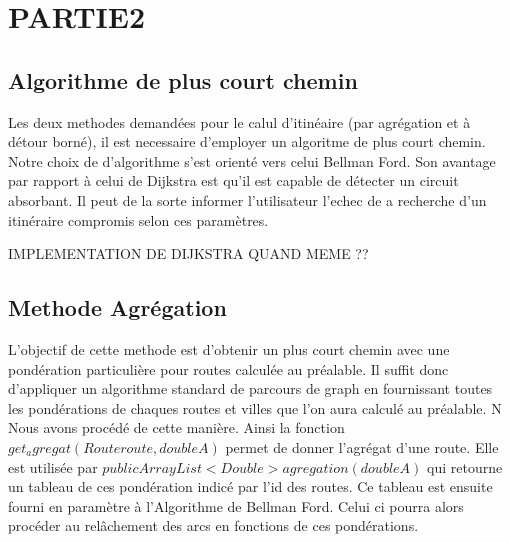 \chapter{PARTIE2}
\section{Algorithme de plus court chemin}
Les deux methodes demandées pour le calul d'itinéaire (par agrégation et à détour borné), il est necessaire  d'employer un algoritme de plus court chemin.
Notre choix de d'algorithme s'est orienté vers celui Bellman Ford. Son avantage par rapport à celui de Dijkstra est qu'il est capable de détecter un circuit absorbant. Il peut de la sorte informer l'utilisateur l'echec de a recherche d'un itinéraire compromis selon ces paramètres. 

IMPLEMENTATION DE DIJKSTRA QUAND MEME ??


\section{Methode Agrégation}
L'objectif de cette methode est d'obtenir un plus court chemin avec une pondération particulière pour routes calculée au préalable.
Il suffit donc d'appliquer un algorithme standard de parcours de graph en fournissant toutes les pondérations de chaques routes et villes que l'on aura calculé au préalable. N Nous avons procédé de cette manière. Ainsi la fonction $get_agregat(Route route, double A)$ permet de donner l'agrégat d'une route. Elle est utilisée par  $public ArrayList<Double> agregation(double A)$ qui retourne un tableau de ces pondération indicé par l'id des routes. Ce tableau est ensuite fourni en paramètre à l'Algorithme de Bellman Ford. Celui ci pourra alors procéder au relâchement des arcs en fonctions de ces pondérations. 

